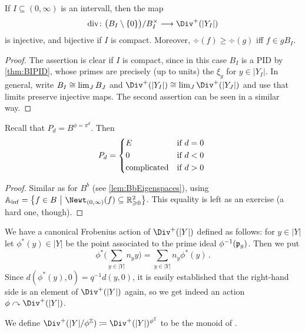 \documentclass[a4paper, 10pt, oneside, DIV=9, chapterprefix=true, numbers=enddot,bibliography=totoc]{scrbook}
\begin{document}
\begin{prop}\label{prop:divInjective}
	If $I\subseteq (0,\infty)$ is an intervall, then the map
	\begin{equation*}
		\div\colon \big(B_I\setminus\{0\}\big)/B_I^\times\morphism \Div^+(|Y_I|)
	\end{equation*}
	is injective, and bijective if $I$ is compact. Moreover, $\div(f)\geq \div(g)$ iff $f\in gB_I$.
\end{prop}
\begin{proof}
	The assertion is clear if $I$ is compact, since in this case $B_I$ is a PID by \cref{thm:BIPID}, whose primes are precisely (up to units) the $\xi_y$ for $y\in |Y_I|$. In general, write $B_I\cong\operatorname*{lim}_JB_J$ and $\Div^+(|Y_I|)\cong \limit_J\Div^+(|Y_J|)$ and use that limits preserve injective maps. The second assertion can be seen in a similar way.
\end{proof}
\begin{lem}\label{lem:PEigenspaces}
	Recall that $P_d=B^{\phi=\pi^d}$. Then
	\begin{equation*}
		P_d=\begin{cases*}
			E & if $d=0$\\
			0 & if $d<0$\\
			\text{complicated} & if $d>0$
		\end{cases*}
	\end{equation*}
\end{lem}
\begin{proof}
	Similar as for $B^b$ (see \cref{lem:BbEigenspaces}), using $\IA_\inf=\left\{f\in B\st\Newt_{(0,\infty)}(f)\subseteq \IR_{\geq 0}^2\right\}$. This equality is left as an exercise (a hard one, though).
\end{proof}
We have a canonical Frobenius action of $\Div^+(|Y|)$ defined as follows: for $y\in|Y|$ let $\phi^*(y)\in |Y|$ be the point associated to the prime ideal $\phi^{-1}(\pp_y)$. Then we put
\begin{equation*}
	\phi^*\Bigg(\sum_{y\in|Y|}n_yy\Bigg)=\sum_{y\in|Y|}n_y\phi^*(y)\,.
\end{equation*}
Since $d(\phi^*(y),0)=q^{-1}d(y,0)$, it is easily established that the right-hand side is an element of $\Div^+(|Y|)$ again, so we get indeed an action $\phi\curvearrowright \Div^+(|Y|)$.
\begin{defi}
	We define $\Div^+(|Y|/\phi^\IZ)\coloneqq \Div^+(|Y|)^{\phi^\IZ}$ to be the monoid of . 
\end{defi}
\end{document}
